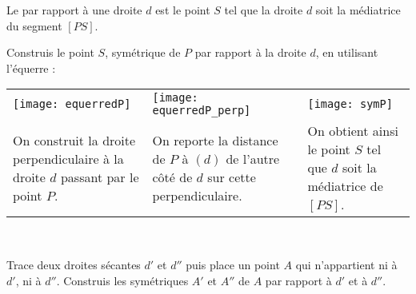 

\begin{methode*1}

\begin{aconnaitre}
Le  par rapport à une droite $d$ est le point $S$ tel que la droite $d$ soit la médiatrice du segment $[PS]$. 
\end{aconnaitre}

\begin{exemple*1}
Construis le point $S$, symétrique de $P$ par rapport à la droite $d$, en utilisant l'équerre : \\[0.5em]
\begin{tabularx}{\textwidth}{X|X|X}
 \texttt{[image: equerredP]} &  \texttt{[image: equerredP\_perp]} & \texttt{[image: symP]} \\ 
 On construit la droite perpendiculaire à la droite $d$ passant par le point $P$. & On reporte la distance de $P$ à $(d)$ de l'autre côté de $d$ sur cette perpendiculaire. & On obtient ainsi le point $S$ tel que $d$ soit la médiatrice de $[PS]$.\\
\end{tabularx} \\
 \end{exemple*1}


\exercice
Trace deux droites sécantes $d'$ et $d''$ puis place un point $A$ qui n'appartient ni à $d'$, ni à $d''$. Construis les symétriques $A'$ et $A''$ de $A$ par rapport à $d'$ et à $d''$.
 
\end{methode*1}


